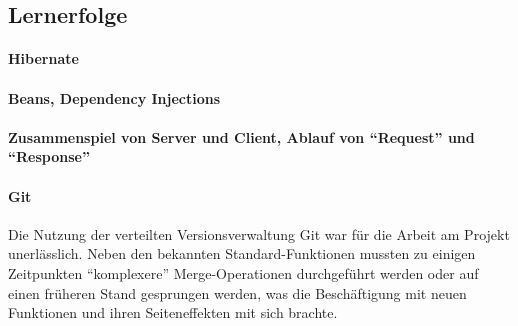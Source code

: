 	\subsection{Lernerfolge}
		\paragraph{Hibernate}
		
		\paragraph{Beans, Dependency Injections}
		
		\paragraph{Zusammenspiel von Server und Client, Ablauf von "`Request"' und "`Response"'}
		
		\paragraph{Git}
		Die Nutzung der verteilten Versionsverwaltung Git war für die Arbeit am Projekt unerlässlich. Neben den bekannten Standard-Funktionen mussten zu einigen Zeitpunkten "`komplexere"' Merge-Operationen durchgeführt werden oder auf einen früheren Stand gesprungen werden, was die Beschäftigung mit neuen Funktionen und ihren Seiteneffekten mit sich brachte.